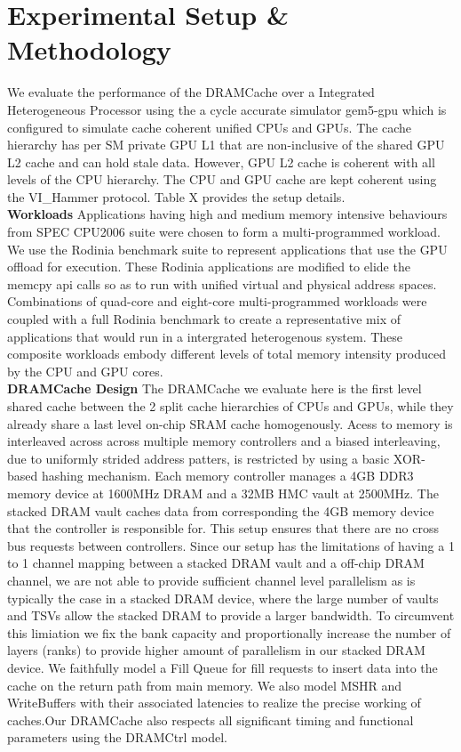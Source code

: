 \section{Experimental Setup \& Methodology} \label{methodology}
We evaluate the performance of the DRAMCache over a Integrated Heterogeneous Processor using the a cycle accurate simulator gem5-gpu \cite{gem5-gpu} which is configured to simulate cache coherent unified CPUs and GPUs. The cache hierarchy has per SM private GPU L1  that are non-inclusive of the shared GPU L2 cache and can hold stale data. However, GPU L2 cache is coherent with all levels of the CPU hierarchy. The CPU and GPU cache are kept coherent using the VI\_Hammer protocol. Table X provides the setup details.\\
\textbf{Workloads} Applications having high and medium memory intensive behaviours from SPEC CPU2006 suite \cite{spec2006} were chosen to form a multi-programmed workload. We use the Rodinia benchmark suite \cite{rodinia} to represent applications that use the GPU offload for execution. These Rodinia applications  are modified to elide the memcpy api calls so as to run with unified virtual and physical address spaces. Combinations of quad-core and eight-core multi-programmed workloads were coupled with a full Rodinia benchmark to create a representative mix of applications that would run in a intergrated heterogenous system. These composite workloads embody different levels of total memory intensity produced by the CPU and GPU cores. \\
\textbf{DRAMCache Design} The DRAMCache we evaluate here is the first level shared cache between the 2 split cache hierarchies of CPUs and GPUs, while they already share a last level on-chip SRAM cache homogenously. Acess to memory is interleaved across across multiple memory controllers and a biased interleaving, due to uniformly strided address patters, is restricted by using a basic XOR-based hashing mechanism. Each memory controller manages a 4GB DDR3 memory device at 1600MHz DRAM and a 32MB HMC vault at 2500MHz. The stacked DRAM vault caches data from corresponding the 4GB memory device that the controller is responsible for. This setup ensures that there are no cross bus requests between controllers. Since our setup has the limitations of having a 1 to 1 channel mapping between a stacked DRAM vault and a off-chip DRAM channel, we are not able to provide sufficient channel level parallelism as is typically the case in a stacked DRAM device, where the large number of vaults and TSVs allow the stacked DRAM to provide a larger bandwidth. To circumvent this limiation we fix the bank capacity and proportionally increase the number of layers (ranks) to provide higher amount of parallelism in our stacked DRAM device. We faithfully model a Fill Queue \cite{dca} for fill requests to insert data into the cache on the return path from main memory. We also model MSHR and WriteBuffers with their associated latencies to realize the precise working of caches.Our DRAMCache also respects all significant timing and functional parameters using the DRAMCtrl \cite{dramctrl} model. \\
